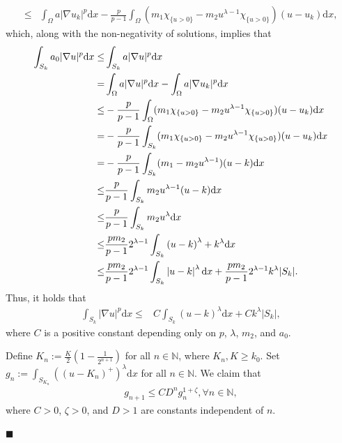 \documentclass[onecolumn]{autart}
\newenvironment{proof}{{\it Proof: \enspace}}{\hfill $\blacksquare$\par}
\begin{document}
\begin{proof}
\begin{align*}
			\leq &  \int_{\Omega}a|\nabla u_k|^{p }  \mathrm{d}x
			-\frac{p}{p-1}\int_{\Omega} (m_1 \chi_{\{u>0\}} - m_2 u^{\lambda - 1} \chi_{\{u > 0\}}  )(u-u_k) \mathrm{d}x,
		\end{align*}
		which, along with the non-negativity of solutions, implies that
		\begin{align}
			\int_{S_k}a_0|\nabla u|^{p } \mathrm{d}x \leq &  \int_{S_k}a |\nabla u|^{p } \mathrm{d}x\notag\\
			=& \int_{\Omega}a|\nabla u|^{p } \mathrm{d}x- \int_{\Omega}a|\nabla u_k|^{p }  \mathrm{d}x
			\notag\\
			\leq &
			-\frac{p}{p-1}\int_{\Omega} (m_1 \chi_{\{u>0\}} - m_2 u^{\lambda - 1} \chi_{\{u > 0\}}  )(u-u_k) \mathrm{d}x\notag\\
			= &
			-\frac{p}{p-1}\int_{S_k} (m_1 \chi_{\{u>0\}} - m_2 u^{\lambda - 1} \chi_{\{u > 0\}}  )(u-u_k) \mathrm{d}x\notag\\
			=&-\frac{p}{p-1}\int_{S_k} (m_1   - m_2 u^{\lambda - 1}   )(u-k) \mathrm{d}x\notag\\
			\leq &\frac{p}{p-1}\int_{S_k}m_2 u^{\lambda - 1}    (u-k) \mathrm{d}x\notag\\
			\leq &\frac{p}{p-1}\int_{S_k}m_2 u^{\lambda  }    \mathrm{d}x\notag\\
			\leq
			&  \frac{p m_2}{p-1} 2^{\lambda-1}\int_{S_k}  \left( u  - k  \right)^\lambda  +k^\lambda \mathrm{d}x
			\notag\\\leq
			& \frac{p m_2}{p-1} 2^{\lambda-1} \int_{S_k}  \left| u  - k  \right|^\lambda   \mathrm{d}x + \frac{p m_2}{p-1} 2^{\lambda-1} k^\lambda |S_k|.   \notag
		\end{align}
		Thus, it holds that
		\begin{align}\label{3.3}
			\int_{S_k} |\nabla u|^p  \mathrm{d}x \leq & C\int_{S_k}  \left( u - k  \right)^\lambda   \mathrm{d}x + Ck^\lambda |S_k|,
		\end{align}
		where   $C$ is a positive  constant  depending only on $p$, $\lambda$, $m_2$,  and $a_0$.
		
		Define $K_n := \frac{K}{2} \left(1 -  \frac{1}{2^{n+1}}\right)$ for all $n \in \mathbb{N}$, where $K_n, K \geq k_0$. Set $g_n := \int_{S_{K_n}} (( u  - K_n)^+)^\lambda \mathrm{d}x$ for all $n \in \mathbb{N}$. We claim that
		\begin{align}\label{3.4}
			g_{n+1} \leq C D^n g_n^{1+\zeta}, {\forall n \in \mathbb{N},}
		\end{align}
		where $C > 0$, $\zeta > 0$, and $D > 1$ are constants independent of $n$.
		

\end{proof}
\end{document}
